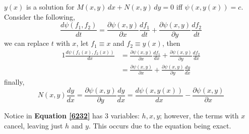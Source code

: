 \documentclass[diffeq.tex]{subfiles}
\begin{document}
    \begin{remark}
        $y(x)$ is a solution for $M(x, y)\,dx + N(x, y)\,dy = 0$ iff $\psi(x, y(x)) = c$.
        Consider the following,
        \[
            \frac{d\psi(f_{1}, f_{2})}{dt} = \frac{\partial \psi(x, y)}{\partial x}\frac{df_{1}}{dt} + \frac{\partial \psi(x, y)}{\partial y}\frac{df_{2}}{dt}
        \]
        we can replace $t$ with $x$, let $f_{1} \equiv x$ and $f_{2} \equiv y(x)$, then
        \begin{alignat}{1}
            \frac{d\psi(f_{1}(x), f_{2}(x))}{dx} &= \frac{\partial \psi(x, y)}{\partial x}\frac{df_{1}}{dx} + \frac{\partial \psi(x, y)}{\partial y}\frac{df_{2}}{dx}\\
            &= \frac{\partial \psi(x, y)}{\partial x} + \frac{\partial \psi(x, y)}{\partial y}\frac{dy}{dx}
        \end{alignat}
        finally,
        \[
            N(x, y)\frac{dy}{dx} = \frac{\partial \psi(x, y)}{\partial y} \frac{dy}{dx} = \frac{d\psi(x, y(x))}{dx} - \frac{\partial \psi(x, y)}{\partial x}
        \]
    \end{remark}
    \begin{remark}
        Notice in \textbf{Equation \ref{6232}} has 3 variables: $h, x, y$; however, the terms with $x$ cancel, leaving just $h$ and $y$. This occurs due to the equation being exact.
    \end{remark}
\end{document}
